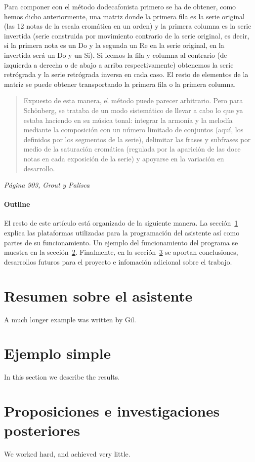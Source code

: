 \documentclass[12pt]{article}
\begin{document}
Para componer con el método dodecafonista primero se ha de obtener, como hemos dicho anteriormente, una matriz donde la primera fila es la serie original (las 12 notas de la escala cromática en un orden) y la primera columna es la serie invertida (serie construida por movimiento contrario de la serie original, es decir, si la primera nota es un Do y la segunda un Re en la serie original, en la invertida será un Do y un Si). Si leemos la fila y columna al contrario (de izquierda a derecha o de abajo a arriba respectivamente) obtenemos la serie retrógrada y la serie retrógrada inversa en cada caso. El resto de elementos de la matriz se puede obtener transportando la primera fila o la primera columna.

\begin{quote}
Expuesto de esta manera, el método puede parecer arbitrario. Pero para Schönberg, se trataba de un modo sistemático de llevar a cabo lo que ya estaba haciendo en su música tonal: integrar la armonía y la melodía mediante la composición con un número limitado de conjuntos (aquí, los definidos por los segmentos de la serie), delimitar las frases y subfrases por medio de la saturación cromática (regulada por la aparición de las doce notas en cada exposición de la serie) y apoyarse en la variación en desarrollo.
\end{quote}\textit{Página 903, Grout y Palisca \cite{palisca}}

\paragraph{Outline}
El resto de este artículo está organizado de la siguiente manera. La sección~\ref{overview} explica las plataformas utilizadas para la programación del asistente así como partes de su funcionamiento.
Un ejemplo del funcionamiento del programa se muestra en la sección~\ref{example}.
Finalmente, en la sección~\ref{conclusions} se aportan conclusiones, desarrollos futuros para el proyecto e infomación adicional sobre el trabajo.

\section{Resumen sobre el asistente}\label{overview}
A much longer \LaTeXe{} example was written by Gil.

\section{Ejemplo simple}\label{example}
In this section we describe the results.

\section{Proposiciones e investigaciones posteriores}\label{conclusions}
We worked hard, and achieved very little.



\end{document}
